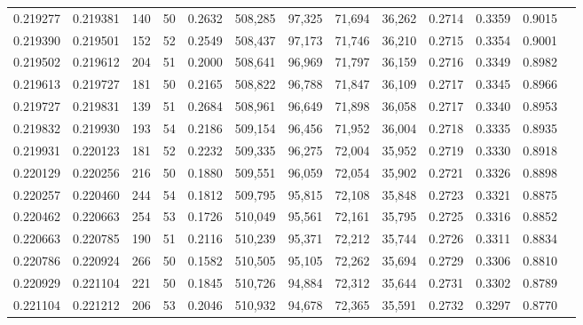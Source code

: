 \begin{tabular}{rrrrrrrrrrrrr}
0.219277 & 0.219381 &   140 &  50 &                                     0.2632 & 508,285 &  97,325 &  71,694 &  36,262 & 0.2714 & 0.3359 & 0.9015 \\
0.219390 & 0.219501 &   152 &  52 &                                     0.2549 & 508,437 &  97,173 &  71,746 &  36,210 & 0.2715 & 0.3354 & 0.9001 \\
0.219502 & 0.219612 &   204 &  51 &                                     0.2000 & 508,641 &  96,969 &  71,797 &  36,159 & 0.2716 & 0.3349 & 0.8982 \\
0.219613 & 0.219727 &   181 &  50 &                                     0.2165 & 508,822 &  96,788 &  71,847 &  36,109 & 0.2717 & 0.3345 & 0.8966 \\
0.219727 & 0.219831 &   139 &  51 &                                     0.2684 & 508,961 &  96,649 &  71,898 &  36,058 & 0.2717 & 0.3340 & 0.8953 \\
0.219832 & 0.219930 &   193 &  54 &                                     0.2186 & 509,154 &  96,456 &  71,952 &  36,004 & 0.2718 & 0.3335 & 0.8935 \\
0.219931 & 0.220123 &   181 &  52 &                                     0.2232 & 509,335 &  96,275 &  72,004 &  35,952 & 0.2719 & 0.3330 & 0.8918 \\
0.220129 & 0.220256 &   216 &  50 &                                     0.1880 & 509,551 &  96,059 &  72,054 &  35,902 & 0.2721 & 0.3326 & 0.8898 \\
0.220257 & 0.220460 &   244 &  54 &                                     0.1812 & 509,795 &  95,815 &  72,108 &  35,848 & 0.2723 & 0.3321 & 0.8875 \\
0.220462 & 0.220663 &   254 &  53 &                                     0.1726 & 510,049 &  95,561 &  72,161 &  35,795 & 0.2725 & 0.3316 & 0.8852 \\
0.220663 & 0.220785 &   190 &  51 &                                     0.2116 & 510,239 &  95,371 &  72,212 &  35,744 & 0.2726 & 0.3311 & 0.8834 \\
0.220786 & 0.220924 &   266 &  50 &                                     0.1582 & 510,505 &  95,105 &  72,262 &  35,694 & 0.2729 & 0.3306 & 0.8810 \\
0.220929 & 0.221104 &   221 &  50 &                                     0.1845 & 510,726 &  94,884 &  72,312 &  35,644 & 0.2731 & 0.3302 & 0.8789 \\
0.221104 & 0.221212 &   206 &  53 &                                     0.2046 & 510,932 &  94,678 &  72,365 &  35,591 & 0.2732 & 0.3297 & 0.8770 \\

\end{tabular}
